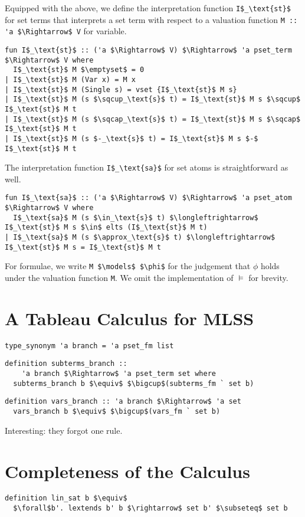 \documentclass[sigplan,10pt,anonymous,review]{acmart}
\begin{document}
Equipped with the above, we define the interpretation function \lstinline!I$_\text{st}$! for set terms that interprets a set term with respect to a valuation function \lstinline!M :: 'a $\Rightarrow$ V! for variable.
\begin{lstlisting}
fun I$_\text{st}$ :: ('a $\Rightarrow$ V) $\Rightarrow$ 'a pset_term $\Rightarrow$ V where
  I$_\text{st}$ M $\emptyset$ = 0
| I$_\text{st}$ M (Var x) = M x
| I$_\text{st}$ M (Single s) = vset {I$_\text{st}$ M s}
| I$_\text{st}$ M (s $\sqcup_\text{s}$ t) = I$_\text{st}$ M s $\sqcup$ I$_\text{st}$ M t 
| I$_\text{st}$ M (s $\sqcap_\text{s}$ t) = I$_\text{st}$ M s $\sqcap$ I$_\text{st}$ M t 
| I$_\text{st}$ M (s $-_\text{s}$ t) = I$_\text{st}$ M s $-$ I$_\text{st}$ M t 
\end{lstlisting}
The interpretation function \lstinline!I$_\text{sa}$! for set atoms is straightforward as well.
\begin{lstlisting}
fun I$_\text{sa}$ :: ('a $\Rightarrow$ V) $\Rightarrow$ 'a pset_atom $\Rightarrow$ V where
  I$_\text{sa}$ M (s $\in_\text{s}$ t) $\longleftrightarrow$ I$_\text{st}$ M s $\in$ elts (I$_\text{st}$ M t)
| I$_\text{sa}$ M (s $\approx_\text{s}$ t) $\longleftrightarrow$ I$_\text{st}$ M s = I$_\text{st}$ M t
\end{lstlisting}
For formulae, we write \lstinline!M $\models$ $\phi$! for the judgement that $\phi$ holds under the valuation function \lstinline!M!.
We omit the implementation of $\models$ for brevity.

\section{A Tableau Calculus for MLSS}
\begin{lstlisting}
type_synonym 'a branch = 'a pset_fm list
\end{lstlisting}

\begin{lstlisting}
definition subterms_branch ::
    'a branch $\Rightarrow$ 'a pset_term set where
  subterms_branch b $\equiv$ $\bigcup$(subterms_fm ` set b)
\end{lstlisting}

\begin{lstlisting}
definition vars_branch :: 'a branch $\Rightarrow$ 'a set 
  vars_branch b $\equiv$ $\bigcup$(vars_fm ` set b)
\end{lstlisting}


Interesting: they forgot one rule.

\section{Completeness of the Calculus}
\begin{lstlisting}
definition lin_sat b $\equiv$
  $\forall$b'. lextends b' b $\rightarrow$ set b' $\subseteq$ set b
\end{lstlisting}
\end{document}
